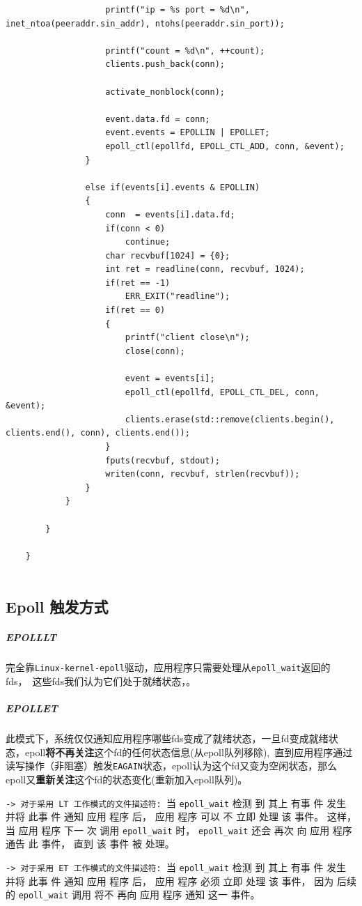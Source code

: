 \documentclass[UTF8,a4paper,12pt]{ctexbook}
\begin{document}
\begin{lstlisting}
					printf("ip = %s port = %d\n", inet_ntoa(peeraddr.sin_addr), ntohs(peeraddr.sin_port));
					
					printf("count = %d\n", ++count);
					clients.push_back(conn);
					
					activate_nonblock(conn);
					
					event.data.fd = conn;
					event.events = EPOLLIN | EPOLLET;
					epoll_ctl(epollfd, EPOLL_CTL_ADD, conn, &event);
				}
				
				else if(events[i].events & EPOLLIN)
				{
					conn  = events[i].data.fd;
					if(conn < 0)
						continue;
					char recvbuf[1024] = {0};
					int ret = readline(conn, recvbuf, 1024);
					if(ret == -1)
						ERR_EXIT("readline");
					if(ret == 0)
					{
						printf("client close\n");
						close(conn);
						
						event = events[i];
						epoll_ctl(epollfd, EPOLL_CTL_DEL, conn, &event);
						clients.erase(std::remove(clients.begin(), clients.end(), conn), clients.end());
					}
					fputs(recvbuf, stdout);
					writen(conn, recvbuf, strlen(recvbuf));
				}
			}
		
		}
		
	}
	
				\end{lstlisting}
			\subsection{Epoll 触发方式}
				\subparagraph{EPOLLLT}完全靠\verb|Linux-kernel-epoll|驱动，应用程序只需要处理从\verb|epoll_wait|返回的fds， 这些fds我们认为它们处于就绪状态，。
				
				\subparagraph{EPOLLET}此模式下，系统仅仅通知应用程序哪些fds变成了就绪状态，一旦fd变成就绪状态，epoll\textbf{将不再关注}这个fd的任何状态信息(从epoll队列移除), 直到应用程序通过读写操作（非阻塞）触发\verb|EAGAIN|状态，epoll认为这个fd又变为空闲状态，那么epoll又\textbf{重新关注}这个fd的状态变化(重新加入epoll队列)。 
				
				\verb|-> 对于采用 LT 工作模式的文件描述符: |当 \verb|epoll_wait| 检测 到 其上 有事 件 发生 并将 此事 件 通知 应用 程序 后， 应用 程序 可以 不 立即 处理 该 事件。 这样， 当 应用 程序 下一 次 调用 \verb|epoll_wait| 时， \verb|epoll_wait| 还会 再次 向 应用 程序 通告 此 事件， 直到 该 事件 被 处理。 
				
				\verb|-> 对于采用 ET 工作模式的文件描述符: |当 \verb|epoll_wait| 检测 到 其上 有事 件 发生 并将 此事 件 通知 应用 程序 后， 应用 程序 必须 立即 处理 该 事件， 因为 后续 的 \verb|epoll_wait| 调用 将不 再向 应用 程序 通知 这一 事件。 
				
\end{document}
